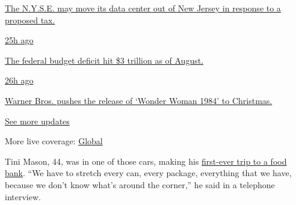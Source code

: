 \href{https://www.nytimes3xbfgragh.onion/live/2020/09/11/business/stock-market-today-coronavirus?action=click\&pgtype=Article\&state=default\&region=MAIN_CONTENT_1\&context=storylines_live_updates\#the-nyse-may-move-its-data-center-out-of-new-jersey-in-response-to-a-proposed-tax}{The
N.Y.S.E. may move its data center out of New Jersey in response to a
proposed tax.}

\href{https://www.nytimes3xbfgragh.onion/live/2020/09/11/business/stock-market-today-coronavirus?action=click\&pgtype=Article\&state=default\&region=MAIN_CONTENT_1\&context=storylines_live_updates\#the-federal-budget-deficit-hit-3-trillion-as-of-august}{25h
ago}

\href{https://www.nytimes3xbfgragh.onion/live/2020/09/11/business/stock-market-today-coronavirus?action=click\&pgtype=Article\&state=default\&region=MAIN_CONTENT_1\&context=storylines_live_updates\#the-federal-budget-deficit-hit-3-trillion-as-of-august}{The
federal budget deficit hit \$3 trillion as of August.}

\href{https://www.nytimes3xbfgragh.onion/live/2020/09/11/business/stock-market-today-coronavirus?action=click\&pgtype=Article\&state=default\&region=MAIN_CONTENT_1\&context=storylines_live_updates\#warner-bros-pushes-the-release-of-wonder-woman-1984-to-christmas}{26h
ago}

\href{https://www.nytimes3xbfgragh.onion/live/2020/09/11/business/stock-market-today-coronavirus?action=click\&pgtype=Article\&state=default\&region=MAIN_CONTENT_1\&context=storylines_live_updates\#warner-bros-pushes-the-release-of-wonder-woman-1984-to-christmas}{Warner
Bros. pushes the release of `Wonder Woman 1984' to Christmas.}

\href{https://www.nytimes3xbfgragh.onion/live/2020/09/11/business/stock-market-today-coronavirus?action=click\&pgtype=Article\&state=default\&region=MAIN_CONTENT_1\&context=storylines_live_updates}{See
more updates}

More live coverage:
\href{https://www.nytimes3xbfgragh.onion/2020/09/11/world/covid-19-coronavirus.html?action=click\&pgtype=Article\&state=default\&region=MAIN_CONTENT_1\&context=storylines_live_updates}{Global}

Tini Mason, 44, was in one of those cars, making his
\href{https://www.nytimes3xbfgragh.onion/2020/03/31/us/virus-food-banks-unemployment.html}{first-ever
trip to a food bank}. ``We have to stretch every can, every package,
everything that we have, because we don't know what's around the
corner,'' he said in a telephone interview.

